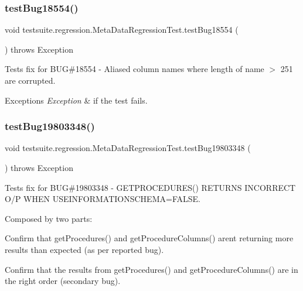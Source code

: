 \subsubsection{\texorpdfstring{test\+Bug18554()}{testBug18554()}}
{\footnotesize\ttfamily void testsuite.\+regression.\+Meta\+Data\+Regression\+Test.\+test\+Bug18554 (\begin{DoxyParamCaption}{ }\end{DoxyParamCaption}) throws Exception}

Tests fix for B\+UG\#18554 -\/ Aliased column names where length of name $>$ 251 are corrupted.


\begin{DoxyExceptions}{Exceptions}
{\em Exception} & if the test fails. \\
\hline
\end{DoxyExceptions}
\mbox{\label{classtestsuite_1_1regression_1_1_meta_data_regression_test_ae07cbe1ade492b69942cdbb52c4ef65a}} 
\subsubsection{\texorpdfstring{test\+Bug19803348()}{testBug19803348()}}
{\footnotesize\ttfamily void testsuite.\+regression.\+Meta\+Data\+Regression\+Test.\+test\+Bug19803348 (\begin{DoxyParamCaption}{ }\end{DoxyParamCaption}) throws Exception}

Tests fix for B\+UG\#19803348 -\/ G\+E\+T\+P\+R\+O\+C\+E\+D\+U\+R\+E\+S() R\+E\+T\+U\+R\+NS I\+N\+C\+O\+R\+R\+E\+CT O/P W\+H\+EN U\+S\+E\+I\+N\+F\+O\+R\+M\+A\+T\+I\+O\+N\+S\+C\+H\+E\+MA=F\+A\+L\+SE.

Composed by two parts\+:
\begin{DoxyEnumerate}
\item Confirm that get\+Procedures() and get\+Procedure\+Columns() aren\textquotesingle{}t returning more results than expected (as per reported bug).
\item Confirm that the results from get\+Procedures() and get\+Procedure\+Columns() are in the right order (secondary bug).
\end{DoxyEnumerate}


